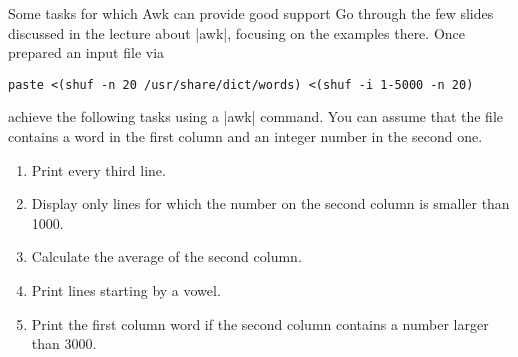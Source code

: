 
\begin{exercise}[Instructive]{Some tasks for which Awk can provide good support}
    Go through the few slides discussed in the lecture about \bash|awk|, focusing on the examples there.
    Once prepared an input file via
    \begin{lstlisting}[style=MyBash]
        paste <(shuf -n 20 /usr/share/dict/words) <(shuf -i 1-5000 -n 20)
    \end{lstlisting}
    achieve the following tasks using a \bash|awk| command.
    You can assume that the file contains a word in the first column and an integer number in the second one.
    \begin{enumerate}
        \item Print every third line.
        \item Display only lines for which the number on the second column is smaller than 1000.
        \item Calculate the average of the second column.
        \item Print lines starting by a vowel.
        \item Print the first column word if the second column contains a number larger than 3000.
    \end{enumerate}
\end{exercise}

